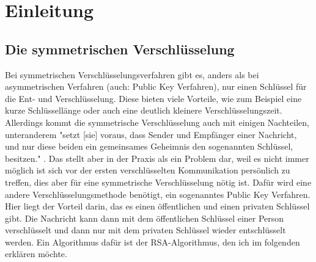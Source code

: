 \documentclass[12pt,a4paper]{scrartcl}
\begin{document}
	
\thispagestyle{empty}
\tableofcontents
\thispagestyle{empty}


\pagebreak
\section{Einleitung}

\subsection{Die symmetrischen Verschlüsselung}

Bei symmetrischen Verschlüsselungsverfahren gibt es, anders als bei asymmetrischen Verfahren (auch: Public Key Verfahren), nur einen Schlüssel für die Ent- und Verschlüsselung. Diese bieten viele Vorteile, wie zum Beispiel eine kurze Schlüssellänge oder auch eine deutlich kleinere Verschlüsselungszeit. Allerdings kommt die symmetrische Verschlüsselung auch mit einigen Nachteilen, unteranderem "setzt [sie] voraus, dass Sender und Empfänger einer Nachricht, und nur diese beiden ein gemeinsames
Geheimnis den sogenannten Schlüssel, besitzen." \cite[S. 7]{schwenk2010sicherheit}. Das stellt aber in der Praxis als ein Problem dar, weil es nicht immer möglich ist sich vor der ersten verschlüsselten Kommunikation persönlich zu treffen, dies aber für eine symmetrische Verschlüsselung nötig ist. Dafür wird eine andere Verschlüsselungsmethode benötigt, ein sogenanntes Public Key Verfahren. Hier liegt der Vorteil darin, das es einen öffentlichen und einen privaten Schlüssel gibt. Die Nachricht kann dann mit dem öffentlichen Schlüssel einer Person verschlüsselt und dann nur mit dem privaten Schlüssel wieder entschlüsselt werden. Ein Algorithmus dafür ist der RSA-Algorithmus, den ich im folgenden erklären möchte.
\end{document}
